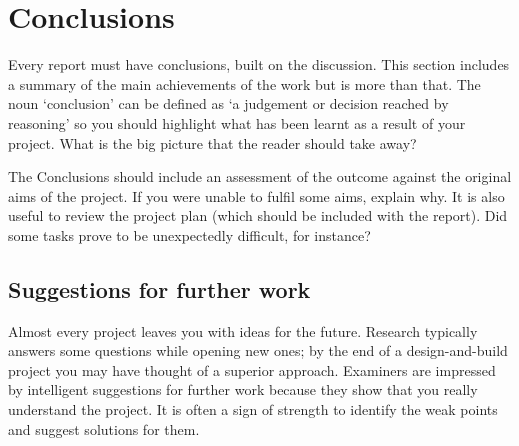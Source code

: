 \section{Conclusions}

Every report must have conclusions, built on the discussion. This section includes a summary of the main achievements of the work but is more than that. The noun `conclusion' can be defined as `a judgement or decision reached by reasoning' \cite{oupconc} so you should highlight what has been learnt as a result of your project. What is the big picture that the reader should take away? 

The Conclusions should include an assessment of the outcome against the original aims of the project. If you were unable to fulfil some aims, explain why. It is also useful to review the project plan (which should be included with the report). Did some tasks prove to be unexpectedly difficult, for instance?

\subsection{Suggestions for further work}

Almost every project leaves you with ideas for the future. Research typically answers some questions while opening new ones; by the end of a design-and-build project you may have thought of a superior approach. Examiners are impressed by intelligent suggestions for further work because they show that you really understand the project. It is often a sign of strength to identify the weak points and suggest solutions for them.


\clearpage %
